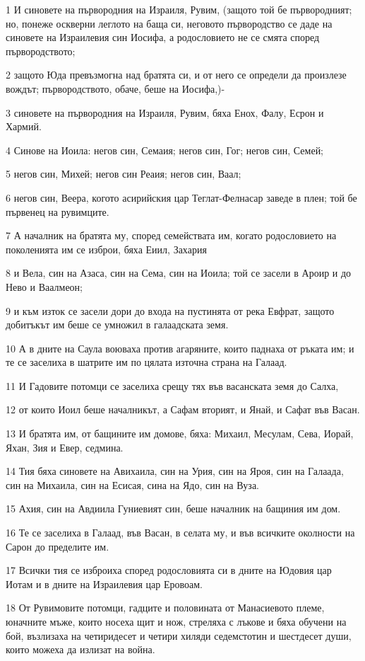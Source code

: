 \par 1 И синовете на първородния на Израиля, Рувим, (защото той бе първородният; но, понеже оскверни леглото на баща си, неговото първородство се даде на синовете на Израилевия син Иосифа, а родословието не се смята според първородството;
\par 2 защото Юда превъзмогна над братята си, и от него се определи да произлезе вождът; първородството, обаче, беше на Иосифа,)-
\par 3 синовете на първородния на Израиля, Рувим, бяха Енох, Фалу, Есрон и Хармий.
\par 4 Синове на Иоила: негов син, Семаия; негов син, Гог; негов син, Семей;
\par 5 негов син, Михей; негов син Реаия; негов син, Ваал;
\par 6 негов син, Веера, когото асирийския цар Теглат-Фелнасар заведе в плен; той бе първенец на рувимците.
\par 7 А началник на братята му, според семействата им, когато родословието на поколенията им се изброи, бяха Еиил, Захария
\par 8 и Вела, син на Азаса, син на Сема, син на Иоила; той се засели в Ароир и до Нево и Ваалмеон;
\par 9 и към изток се засели дори до входа на пустинята от река Евфрат, защото добитъкът им беше се умножил в галаадската земя.
\par 10 А в дните на Саула воюваха против агаряните, които паднаха от ръката им; и те се заселиха в шатрите им по цялата източна страна на Галаад.
\par 11 И Гадовите потомци се заселиха срещу тях във васанската земя до Салха,
\par 12 от които Иоил беше началникът, а Сафам вторият, и Янай, и Сафат във Васан.
\par 13 И братята им, от бащините им домове, бяха: Михаил, Месулам, Сева, Иорай, Яхан, Зия и Евер, седмина.
\par 14 Тия бяха синовете на Авихаила, син на Урия, син на Яроя, син на Галаада, син на Михаила, син на Есисая, сина на Ядо, син на Вуза.
\par 15 Ахия, син на Авдиила Гуниевият син, беше началник на бащиния им дом.
\par 16 Те се заселиха в Галаад, във Васан, в селата му, и във всичките околности на Сарон до пределите им.
\par 17 Всички тия се изброиха според родословията си в дните на Юдовия цар Иотам и в дните на Израилевия цар Еровоам.
\par 18 От Рувимовите потомци, гадците и половината от Манасиевото племе, юначните мъже, които носеха щит и нож, стреляха с лъкове и бяха обучени на бой, възлизаха на четиридесет и четири хиляди седемстотин и шестдесет души, които можеха да излизат на война.
